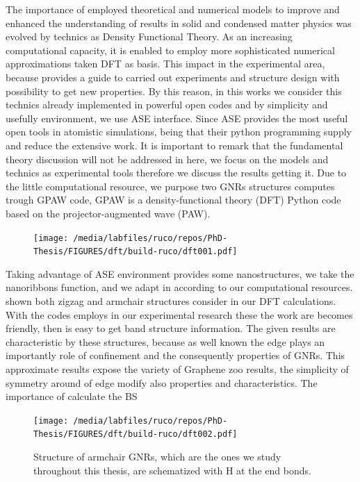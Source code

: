 The importance of employed theoretical and numerical models to improve and enhanced the understanding of results in solid and condensed matter physics was evolved by technics as Density Functional Theory. As an increasing computational  capacity, it is enabled to employ more sophisticated numerical approximations taken  DFT as basis. This impact in the experimental area, because provides a guide to carried out experiments and structure design\cite{zangwill2015density} with  possibility to get new properties. By this reason, in this works we consider this technics already implemented  in powerful  open codes and  by simplicity and usefully environment, we use ASE interface\cite{ask2017ase}. Since ASE provides the most useful open tools in atomistic simulations, being that their python programming supply and reduce the extensive work. It is important to remark that the fundamental theory discussion will not be addressed in here, we focus on the models and technics as experimental tools therefore we discuss the results getting it. Due to the little computational resource, we purpose two GNRs  structures computes trough GPAW code\cite{electronic2010enkovaara,real-space2005mortensen}, GPAW is a density-functional theory (DFT) Python code based on the projector-augmented wave (PAW)\cite{rostgaard2006exact,blochlprojector1994}.
\begin{figure}[H]
	\centering
	\texttt{[image: /media/labfiles/ruco/repos/PhD-Thesis/FIGURES/dft/build-ruco/dft001.pdf]}
	\caption{}
	\label{fig:intro-dft-structure}
\end{figure}
 Taking advantage of ASE environment provides some nanostructures, we take the nanoribbons function, and we adapt in according to our computational resources.  shown both zigzag and armchair structures consider in our DFT calculations. With the codes employs in our experimental research these the work are becomes friendly, then is easy to get band structure information. The given results are characteristic by these structures, because as well known the edge plays an importantly role of confinement and the consequently properties of GNRs. This approximate results expose the variety of Graphene zoo results, the simplicity of symmetry around of edge modify also properties and characteristics. The importance of calculate the \gls{BS} 



\begin{figure}[H]
	\centering
	\texttt{[image: /media/labfiles/ruco/repos/PhD-Thesis/FIGURES/dft/build-ruco/dft002.pdf]}
	\caption{Structure of armchair GNRs, which are the ones we study throughout this thesis, are schematized with H at the end bonds. }
	\label{fig:introfig32}
\end{figure}




